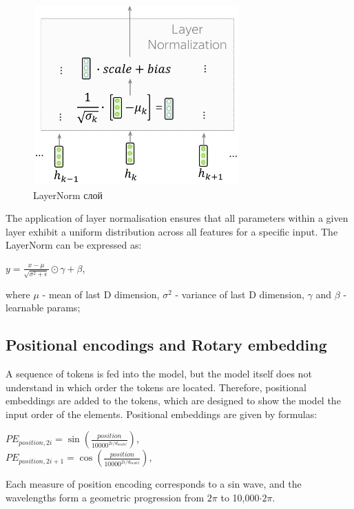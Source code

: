 \documentclass[PMI,VKR]{HSEUniversity}
\begin{document}
\begin{figure}[h]
    \centering
    \includegraphics[scale=1]{img/layer_norm.png}
    \caption{LayerNorm слой}
\end{figure}

The application of layer normalisation ensures that all parameters within a given layer exhibit a uniform distribution across all features for a specific input.
The LayerNorm can be expressed as:
\begin{center}
    $y = \frac{x - \mu}{\sqrt{\sigma^{2} + \epsilon}} \odot \gamma + \beta$,
\end{center}
where $\mu$ - mean of last D dimension, $\sigma^2$ - variance of last D dimension, $\gamma$ and $\beta$ - learnable params;
      

\subsection{Positional encodings and Rotary embedding}

A sequence of tokens is fed into the model, but the model itself does not understand in which order the tokens are located. 
Therefore, positional embeddings are added to the tokens, which are designed to show the model the input order of the elements.
Positional embeddings are given by formulas:
\begin{center}
    $PE_{position, 2i} = \sin(\frac{position}{10000^{2i/d_{model}}})$, \\
    $PE_{position, 2i+1} = \cos(\frac{position}{10000^{2i/d_{model}}})$, \\
\end{center}

Each measure of position encoding corresponds to a sin wave, and the wavelengths form a geometric progression from $2\pi$ to 10,000$\cdot 2\pi$.
\end{document}
